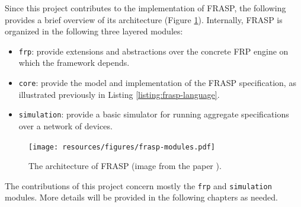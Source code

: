 Since this project contributes to the implementation of FRASP, the following
provides a brief overview of its architecture (Figure
\ref{figure:frasp-modules}). Internally, FRASP is organized in the following
three layered modules:
\begin{itemize}
  \item \texttt{frp}: provide extensions and abstractions over the concrete
        \ac{FRP} engine on which the framework depends.
  \item \texttt{core}: provide the model and implementation of the FRASP
        specification, as illustrated previously in Listing
        \ref{listing:frasp-language}.
  \item \texttt{simulation}: provide a basic simulator for running aggregate
        specifications over a network of devices.
\end{itemize}
\begin{figure}[!ht]
  \centering
  \texttt{[image: resources/figures/frasp-modules.pdf]}
  \caption[The architecture of FRASP]{
    The architecture of FRASP (image from the paper \cite{FRASP}).
  }
  \label{figure:frasp-modules}
\end{figure}

The contributions of this project concern mostly the \texttt{frp} and
\texttt{simulation} modules. More details will be provided in the following
chapters as needed.
